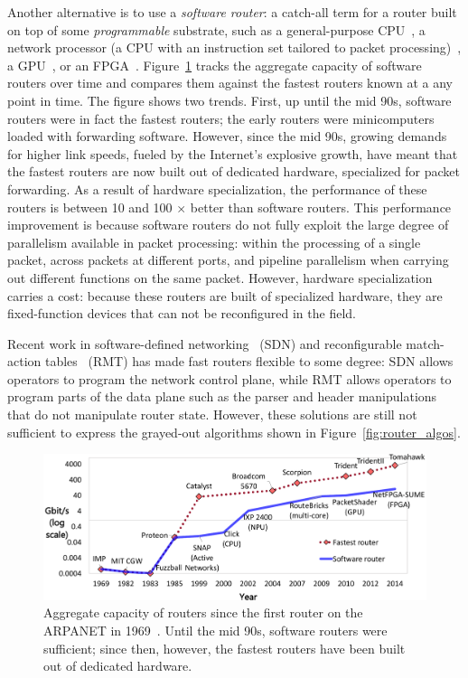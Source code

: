 Another alternative is to use a \textit{software router}: a catch-all term for
a router built on top of some \textit{programmable} substrate, such as a
general-purpose CPU~\cite{click, routebricks}, a network processor (a CPU with
an instruction set tailored to packet processing)~\cite{ixp4xx, ipx2800}, a
GPU~\cite{packetshader}, or an FPGA~\cite{netfpga}.
Figure~\ref{fig:router_evolution} tracks the aggregate capacity of software
routers over time and compares them against the fastest routers known at a any
point in time. The figure shows two trends. First, up until the mid 90s,
software routers were in fact the fastest routers; the early routers were
minicomputers loaded with forwarding software. However, since the mid 90s,
growing demands for higher link speeds, fueled by the Internet's explosive
growth, have meant that the fastest routers are now built out of dedicated
hardware, specialized for packet forwarding. As a result of hardware specialization,
the performance of these routers is between 10 and 100 $\times$ better than software routers. This performance improvement is because software routers do not fully
exploit the large degree of parallelism available in packet processing:
within the processing of a single packet, across packets at different ports,
and pipeline parallelism when carrying out different functions on the same
packet. However, hardware specialization carries a cost: because these routers are
built of specialized hardware, they are fixed-function devices that can not be
reconfigured in the field.

Recent work in software-defined networking~\cite{openflow} (SDN) and
reconfigurable match-action tables~\cite{rmt} (RMT) has made fast routers
flexible to some degree: SDN allows operators to program the network control
plane, while RMT allows operators to program parts of the data plane such as
the parser and header manipulations that do not manipulate router state.
However, these solutions are still not sufficient to express the grayed-out
algorithms shown in Figure~\ref{fig:router_algos}.

\begin{figure}
\centering
\includegraphics[width=\columnwidth]{router_evolution.pdf}
\caption{Aggregate capacity of routers since the first router on the ARPANET in
1969~\cite{imp}. Until the mid 90s, software routers were sufficient; since
then, however, the fastest routers have been built out of dedicated hardware.}
\label{fig:router_evolution}
\end{figure}

